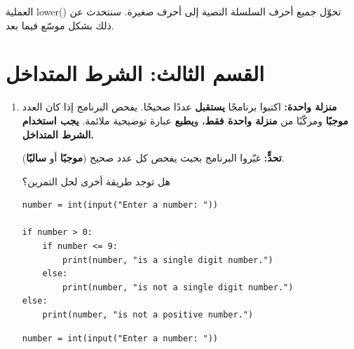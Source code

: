\documentclass[14pt]{extarticle}
\begin{document}
\begin{enumerate}[resume, label=\textbf{تمرين \arabic*:}, wide=0pt, itemsep=2.2em]
\begin{boxNote}
العملية \textenglish{lower()} تحوّل جميع أحرف السلسلة النصية إلى أحرف صغيرة. سنتحدث عن ذلك بشكل موسّع فيما بعد.
\end{boxNote}

\fi

\end{enumerate}

\clearpage
\section*{القسم الثالث: الشرط المتداخل}

\begin{enumerate}[resume, label=\textbf{تمرين \arabic*:}, wide=0pt, itemsep=2.2em]

\item \textbf{منزلة واحدة:} اكتبوا برنامجًا \textbf{يستقبل} عددًا صحيحًا. يفحص البرنامج إذا كان العدد \textbf{موجبًا} ومركّبًا من \textbf{منزلة واحدة فقط}، و\textbf{يطبع} عبارة توضيحية ملائمة. \textbf{يجب استخدام الشرط المتداخل.}

\textbf{تحدٍّ:} غيّروا البرنامج بحيث يفحص كل عدد صحيح (\textbf{موجبًا} أو \textbf{سالبًا}).

\begin{boxAttention}
هل توجد طريقة أخرى لحل التمرين؟
\end{boxAttention}

\ifwithsols
\begin{boxSolution}[1]
\begin{english}
\begin{verbatim}
number = int(input("Enter a number: "))

if number > 0:
    if number <= 9:
        print(number, "is a single digit number.")
    else:
        print(number, "is not a single digit number.")
else:
    print(number, "is not a positive number.")
\end{verbatim}
\end{english}
\end{boxSolution}

\begin{boxSolution}
\begin{english}
\begin{verbatim}
number = int(input("Enter a number: "))


\end{verbatim}
\end{english}
\end{boxSolution}
\end{enumerate}
\end{document}
